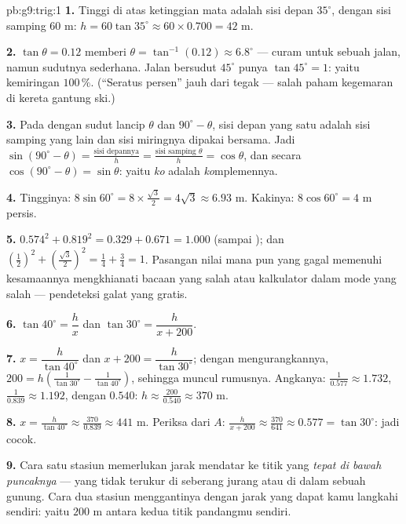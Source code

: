 \begin{solution}{pb:g9:trig:1}
\textbf{1.} Tinggi di atas ketinggian mata adalah sisi depan
$35^\circ$, dengan sisi samping $60$ m:
$h = 60 \tan 35^\circ \approx 60 \times 0.700 = 42$ m.

\textbf{2.} $\tan\theta = 0.12$ memberi
$\theta = \tan^{-1}(0.12) \approx 6.8^\circ$ --- curam untuk sebuah
jalan, namun sudutnya sederhana. Jalan bersudut $45^\circ$ punya
$\tan 45^\circ = 1$: yaitu kemiringan $100\,\%$. (``Seratus
persen'' jauh dari tegak --- salah paham kegemaran di kereta gantung
ski.)

\textbf{3.} Pada  dengan sudut lancip $\theta$ dan
$90^\circ - \theta$, sisi depan yang satu adalah sisi samping yang
lain dan sisi miringnya dipakai bersama. Jadi
$\sin(90^\circ - \theta) = \frac{\text{sisi depannya}}{h} =
\frac{\text{sisi samping }\theta}{h} = \cos\theta$, dan secara
 $\cos(90^\circ - \theta) = \sin\theta$: yaitu
\emph{ko} adalah  \emph{ko}mplemennya.

\textbf{4.} Tingginya: $8 \sin 60^\circ = 8 \times
\frac{\sqrt3}{2} = 4\sqrt3 \approx 6.93$ m. Kakinya:
$8 \cos 60^\circ = 4$ m persis.

\textbf{5.} $0.574^2 + 0.819^2 = 0.329 + 0.671 = 1.000$ (sampai
); dan $\left(\frac12\right)^2 +
\left(\frac{\sqrt3}{2}\right)^2 = \frac14 + \frac34 = 1$. Pasangan
nilai mana pun yang gagal memenuhi kesamaannya mengkhianati bacaan
yang salah atau kalkulator dalam mode yang salah --- pendeteksi galat
yang gratis.

\textbf{6.} $\tan 40^\circ = \dfrac hx$ dan
$\tan 30^\circ = \dfrac{h}{x + 200}$.

\textbf{7.} $x = \dfrac{h}{\tan 40^\circ}$ dan
$x + 200 = \dfrac{h}{\tan 30^\circ}$; dengan mengurangkannya,
$200 = h\left(\frac{1}{\tan 30^\circ} -
\frac{1}{\tan 40^\circ}\right)$, sehingga muncul rumusnya.
Angkanya: $\frac{1}{0.577} \approx 1.732$, $\frac{1}{0.839} \approx
1.192$, dengan  $0.540$:
$h \approx \frac{200}{0.540} \approx 370$ m.

\textbf{8.} $x = \frac{h}{\tan 40^\circ} \approx
\frac{370}{0.839} \approx 441$ m. Periksa dari $A$:
$\frac{h}{x + 200} \approx \frac{370}{641} \approx 0.577 =
\tan 30^\circ$: jadi cocok.

\textbf{9.} Cara satu stasiun memerlukan jarak mendatar ke titik
yang \emph{tepat di bawah puncaknya} --- yang tidak terukur di
seberang jurang atau di dalam sebuah gunung. Cara
dua stasiun menggantinya dengan jarak yang dapat kamu langkahi
sendiri: yaitu $200$ m antara kedua titik pandangmu sendiri.


\end{solution}
